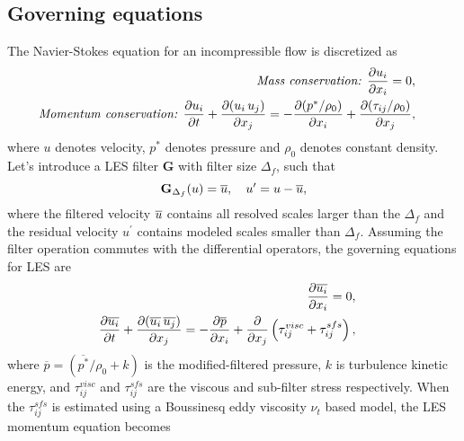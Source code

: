 \subsection{Governing equations}
The Navier-Stokes equation for an incompressible flow is discretized as 
\begin{subequations}
\begin{align}
\begin{split}
\textit{Mass conservation: } & \frac{\partial u_i}{\partial x_{i}} = 0,
\end{split} \\
\begin{split}
\textit{Momentum conservation: } & \frac{\partial {u_i}}{\partial t} +\frac{\partial (u_i \, u_j)}{\partial x_{j}} = -\frac{\partial (p^*/\rho_0)}{\partial x_{i}} + \frac{\partial (\tau_{ij}/\rho_0)}{\partial x_{j}},
\end{split}
\end{align}
\label{eqn:incomFlow}
\end{subequations}
where $u$ denotes velocity, $p^*$ denotes pressure and $\rho_0$ denotes constant density. Let's introduce a LES filter $\mathbf{G}$ with filter size $\Delta_f$, such that 
\begin{equation}
\mathbf{G}_{\Delta_f}(u) = \overline{u}, \quad u^{\prime} = u - \overline{u},
\end{equation}
where the filtered velocity $\overline{u}$ contains all resolved scales larger than the $\Delta_f$ and the residual velocity $u^{\prime}$ contains modeled scales smaller than $\Delta_f$. Assuming the filter operation commutes with the differential operators, the governing equations for LES are
\begin{subequations}
\begin{align}
\begin{split}
\frac{\partial \overline{u_i}}{\partial x_{i}} & = 0,
\end{split} \\
\begin{split}
 \frac{\partial {\overline{u_i}}}{\partial t} + \frac{\partial (\overline{u_i} \, \overline{u_j} )}{\partial x_{j}} & = -\frac{\partial \overline{p}}{\partial x_{i}} + \frac{\partial}{\partial x_j} \left( \tau_{ij}^{visc} + \tau_{ij}^{sfs} \right),
\end{split}
\end{align}
\label{eqn:LES}
\end{subequations}
where $\overline{p} = (\overline{p^*}/\rho_0 + k)$ is the modified-filtered pressure, $k$ is turbulence kinetic energy, and $\tau_{ij}^{visc}$ and $\tau_{ij}^{sfs}$ are the viscous and sub-filter stress respectively. When the $\tau_{ij}^{sfs}$ is estimated using a Boussinesq eddy viscosity $ \nu_t$ based model, the LES momentum equation becomes 
